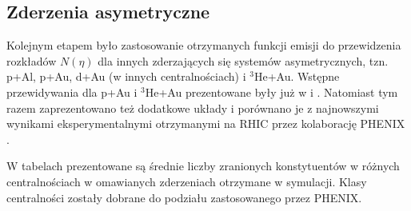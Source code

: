 \documentclass[a4paper,12pt]{article}
\begin{document}
\subsection{Zderzenia asymetryczne}
Kolejnym etapem było zastosowanie otrzymanych funkcji emisji do przewidzenia rozkładów $N(\eta)$ dla innych zderzających się systemów asymetrycznych, tzn. p+Al, p+Au, d+Au (w innych centralnościach) i $^3$He+Au. Wstępne przewidywania dla p+Au i $^3$He+Au prezentowane były już w \cite{Barej:pracaInz18} i \cite{Barej:2017kcw}. Natomiast tym razem zaprezentowano też dodatkowe układy i porównano je z najnowszymi wynikami eksperymentalnymi otrzymanymi na RHIC przez kolaborację PHENIX \cite{Adare:2018toe}.

W tabelach  prezentowane są średnie liczby zranionych konstytuentów w różnych centralnościach w omawianych zderzeniach otrzymane w symulacji. Klasy centralności zostały dobrane do podziału zastosowanego przez PHENIX.
\end{document}
